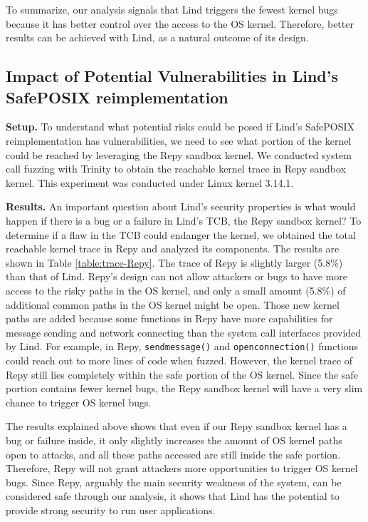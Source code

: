{{{To summarize, our analysis signals that Lind triggers the fewest kernel bugs because
it has better control over the access to the OS kernel.
Therefore, better results can be achieved with Lind, as a natural
outcome of its design. 

\subsection{Impact of Potential Vulnerabilities in Lind's SafePOSIX reimplementation}
\label{Reachable-Kernel-Trace-Analysis-for-Repy-Sandbox}

\textbf{Setup.}
To understand what potential risks could be posed if Lind's SafePOSIX reimplementation 
has vulnerabilities, we need to see what portion of the kernel could be reached by 
leveraging the Repy sandbox kernel. We conducted system call fuzzing with Trinity 
to obtain the reachable kernel trace in Repy sandbox kernel. 
This experiment was conducted under Linux kernel 3.14.1.

\noindent
\textbf{Results.}
An important question about Lind's security properties is what would happen if
there is a bug or a failure in Lind's TCB,
the Repy sandbox kernel? To determine if a flaw in the TCB could endanger the kernel,
we obtained the total reachable kernel trace in Repy and analyzed its
components.
The results are shown in Table \ref{table:trace-Repy}. The trace of Repy is
slightly larger (5.8\%) than that of Lind.
Repy's design can not allow attackers or bugs to
have more access to the risky paths in the OS kernel, and only a small amount (5.8\%) of
additional common paths in the OS kernel might be open.
Those new kernel paths are added because some functions in Repy
have more capabilities for message sending and network connecting than the system call interfaces
provided by Lind. For example, in Repy,
\texttt{sendmessage()} and \texttt{openconnection()}
functions could reach out to more lines of code when fuzzed. However, the kernel
 trace of Repy still lies completely within the safe
portion of the OS kernel.
Since the safe portion contains fewer kernel bugs, the Repy sandbox kernel
will have a very slim chance to trigger OS kernel bugs.

The results explained above shows that even if our Repy sandbox kernel has a
bug or failure inside,
it only slightly increases the amount of OS kernel paths open to attacks,
and all these paths accessed are still inside the safe portion.
Therefore, Repy will not grant attackers more opportunities to trigger OS
kernel bugs.
Since Repy, arguably the main security weakness of the system, can be
considered safe through our analysis,
it shows that Lind has the potential to provide strong security to run user applications.

}}}
